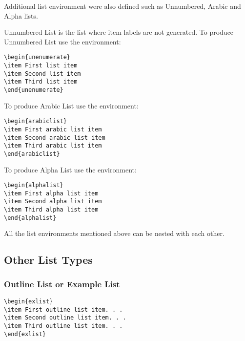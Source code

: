 \documentclass{clv3}
\begin{document}
Additional list environment were also defined such as Unnumbered, Arabic and Alpha lists.

Unnumbered List is the list where item labels are not generated. To produce Unnumbered List use the environment:

\begin{verbatim}
\begin{unenumerate}
\item First list item
\item Second list item
\item Third list item
\end{unenumerate}
\end{verbatim}

To produce Arabic List use the environment:

\begin{verbatim}
\begin{arabiclist}
\item First arabic list item
\item Second arabic list item
\item Third arabic list item
\end{arabiclist}
\end{verbatim}

To produce Alpha List use the environment:

\begin{verbatim}
\begin{alphalist}
\item First alpha list item
\item Second alpha list item
\item Third alpha list item
\end{alphalist}
\end{verbatim}

All the list environments mentioned above can be nested with each other.

\subsection{Other List Types}

\subsubsection{Outline List or Example List}

\begin{verbatim}
\begin{exlist}
\item First outline list item. . .
\item Second outline list item. . .
\item Third outline list item. . .
\end{exlist}
\end{verbatim}
\end{document}
